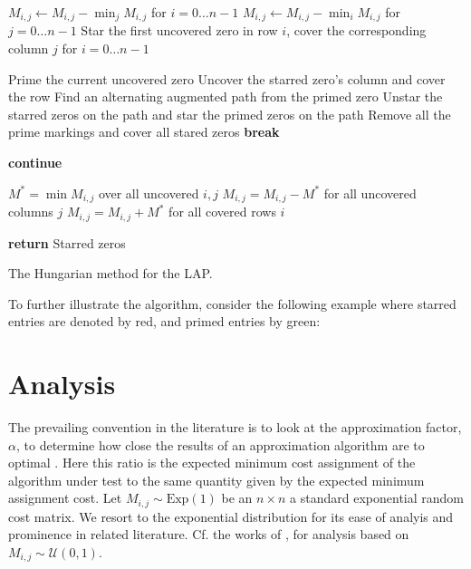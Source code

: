\documentclass{article}
\newcommand{\exprv}[1]{\text{Exp} \left( #1 \right )}
\begin{document}
\begin{algorithm}
\begin{algorithmic}
 
\State $M_{i,j} \gets M_{i,j} - \min_j M_{i,j}$ for $ i = 0 \ldots n - 1$
\State $M_{i,j} \gets M_{i,j} - \min_i M_{i,j}$ for $ j = 0 \ldots n - 1$
\State Star the first uncovered zero in row $i$, cover the corresponding column $j$ for $ i = 0 \ldots n - 1$

		\State Prime the current uncovered zero
			\State Uncover the starred zero's column and cover the row
		\Else
			\State Find an alternating augmented path from the primed zero
			\State Unstar the starred zeros on the path and star the primed zeros on the path
			\State Remove all the prime markings and cover all stared zeros
			\State \textbf{break}
		\EndIf
	\EndWhile

		\State \textbf{continue}
	\EndIf

	\State $M^* = \min M_{i,j}$ over all uncovered $i, j$
	\State $M_{i,j} = M_{i,j} - M^*$ for all uncovered columns $j$
	\State $M_{i,j} = M_{i,j} + M^*$ for all covered rows $i$
\EndWhile

\State \textbf{return} Starred zeros 
\EndProcedure
\end{algorithmic}
\caption{The Hungarian method for the LAP.}
\label{alg:hungarian}
\end{algorithm}

To further illustrate the algorithm, consider the following example where starred entries are denoted by red, and primed entries by green:


\section{Analysis}

The prevailing convention in the literature is to look at the approximation factor, $\alpha$, to determine how close the results of an approximation algorithm are to optimal \cite{williamson2011design}. Here this ratio is the expected minimum cost assignment of the algorithm under test to the same quantity given by the expected minimum assignment cost. Let $M_{i,j} \sim \exprv{1}$ be an $n \times n$ a standard exponential random cost matrix. We resort to the exponential distribution for its ease of analyis and prominence in related literature. Cf. the works of \cite{kurtzberg1962approximation}, \cite{michael1990probability} for analysis based on $M_{i,j} \sim \mathcal{U}(0,1)$.
\end{document}
